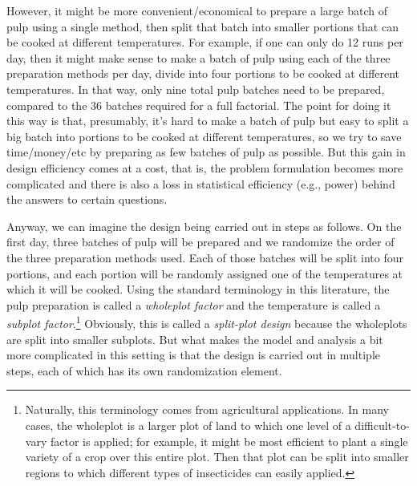 \documentclass[a4paper, 12pt]{article}
\theoremstyle{plain}
\theoremstyle{definition}
\theoremstyle{remark}
\begin{document}
However, it might be more convenient/economical to prepare a large batch of pulp using a single method, then split that batch into smaller portions that can be cooked at different temperatures.  For example, if one can only do 12 runs per day, then it might make sense to make a batch of pulp using each of the three preparation methods per day, divide into four portions to be cooked at different temperatures.  In that way, only nine total pulp batches need to be prepared, compared to the 36 batches required for a full factorial.  The point for doing it this way is that, presumably, it's hard to make a batch of pulp but easy to split a big batch into portions to be cooked at different temperatures, so we try to save time/money/etc by preparing as few batches of pulp as possible.  But this gain in design efficiency comes at a cost, that is, the problem formulation becomes more complicated and there is also a loss in statistical efficiency (e.g., power) behind the answers to certain questions.  

Anyway, we can imagine the design being carried out in steps as follows.  On the first day, three batches of pulp will be prepared and we randomize the order of the three preparation methods used.  Each of those batches will be split into four portions, and each portion will be randomly assigned one of the temperatures at which it will be cooked.  Using the standard terminology in this literature, the pulp preparation is called a {\em wholeplot factor} and the temperature is called a {\em subplot factor}.\footnote{Naturally, this terminology comes from agricultural applications.  In many cases, the wholeplot is a larger plot of land to which one level of a difficult-to-vary factor is applied; for example, it might be most efficient to plant a single variety of a crop over this entire plot.  Then that plot can be split into smaller regions to which different types of insecticides can easily applied.}  Obviously, this is called a {\em split-plot design} because the wholeplots are split into smaller subplots.  But what makes the model and analysis a bit more complicated in this setting is that the design is carried out in multiple steps, each of which has its own randomization element.  
\end{document}
